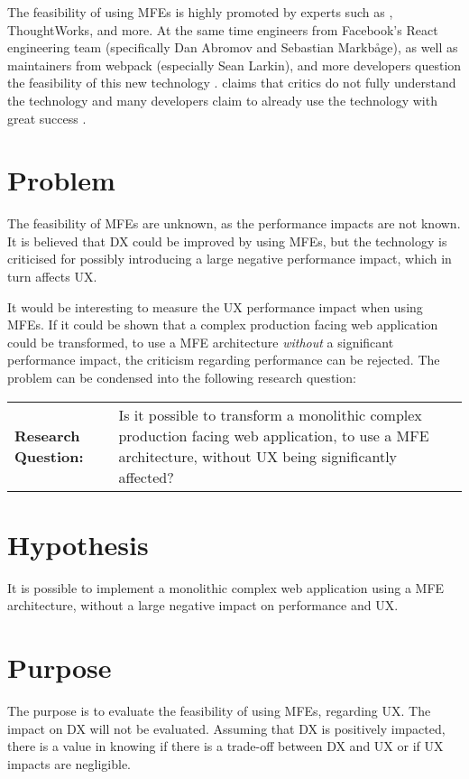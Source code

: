 The feasibility of using \acp{MFE} is highly promoted by experts such as \citeauthor{Jackson2019}, ThoughtWorks, and more. At the same time engineers from Facebook's React engineering team (specifically Dan Abromov and Sebastian Markbåge), as well as maintainers from webpack (especially Sean Larkin), and more developers question the feasibility of this new technology \cite{Denning}. \citeauthor{Denning} claims that critics do not fully understand the technology and many developers claim to already use the technology with great success \cite{Noel,ThoughtWorks}.

\section{Problem}

The feasibility of \acp{MFE} are unknown, as the performance impacts are not known. It is believed that \ac{DX} could be improved by using \acp{MFE}, but the technology is criticised for possibly introducing a large negative performance impact, which in turn affects \ac{UX}.


It would be interesting to measure the \ac{UX} performance impact when using \acp{MFE}. If it could be shown that a complex production facing web application could be transformed, to use a \ac{MFE} architecture \textit{without} a significant performance impact, the criticism regarding performance can be rejected. The problem can be condensed into the following research question:

\begin{center}
\begin{tabular}{p{}p{}}
     \textbf{Research Question:} & Is it possible to transform a monolithic complex production facing web application, to use a \ac{MFE} architecture, without \ac{UX} being significantly affected?
\end{tabular}
\end{center}

\section{Hypothesis}
It is possible to implement a monolithic complex web application using a \ac{MFE} architecture, without a large negative impact on performance and \ac{UX}.

\section{Purpose}
The purpose is to evaluate the feasibility of using \acp{MFE}, regarding \ac{UX}. The impact on \ac{DX} will not be evaluated. Assuming that \ac{DX} is positively impacted, there is a value in knowing if there is a trade-off between \ac{DX} and \ac{UX} or if \ac{UX} impacts are negligible.

